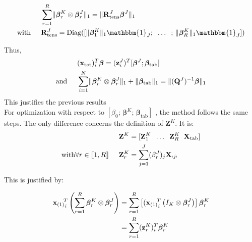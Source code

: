 \documentclass[preprint,12pt]{elsarticle}
\begin{document}
\begin{align}
                                & \sum\limits_{r = 1}^R \lVert \bm{\beta}_r^K \otimes \bm{\beta}_r^J \rVert_1 = \lVert \mathbf{R}_{\text{tens}}^J \bm{\beta}^J\rVert_1                             \\
    \text{with} \hspace{0.5 cm} & \mathbf{R}_{\text{tens}}^J = \text{Diag}([\lVert \bm{\beta}_1^K \rVert_1 \mathbbm{1}_J; \; \; \hdots \; \; ; \,  \lVert \bm{\beta}_R^K \rVert_1 \mathbbm{1}_J ])
\end{align}

\noindent Thus,
\begin{align}
                               & (\mathbf{x}_{\text{tot}})_i^T \bm{\beta}= (\mathbf{z}_i^J)^T [\bm{\beta}^J; \bm{\beta}_{\text{tab}}] \\
    \text{and} \hspace{0.5 cm} & \sum\limits_{i = 1}^N
    \lVert \bm{\beta}_r^K \otimes \bm{\beta}_r^J \rVert_1 + \lVert \bm{\beta}_{\text{tab}} \rVert_1= \lVert (\mathbf{Q}^J)^{-1} \bm{\beta} \rVert_1
\end{align}
This justifies the previous results\\[5 pt]
\noindent For optimization with respect to $\left[ \beta_0; \, \bm{\beta}^K; \, \bm{\beta}_{\text{tab}}  \right]$ , the method follows the same steps. The only difference concerns the definition of $\mathbf{Z}^K$. It is:
\begin{align}
                                                                         & \mathbf{Z}^K = [\mathbf{Z}_1^K \; \; \hdots \; \; \mathbf{Z}_R^K \; \; \mathbf{X}_{\text{tab}}] \\
    \text{with} \forall r \in \llbracket 1, R \rrbracket \hspace{0.5 cm} & \mathbf{Z}_r^K = \sum\limits_{j = 1}^J (\beta_r^J)_j \mathbf{X}_{:j:}
\end{align}

\noindent This is justified by:

\begin{align}
    {{\mathbf{x}_{(1)}}_i}^{\hspace{-5 pt} T}  \left( \sum\limits_{r = 1}^R \bm{\beta}_r^K \otimes \bm{\beta}_r^J \right) & = \sum\limits_{r = 1}^R \left[ ({{\mathbf{x}_{(1)}}_i}^{\hspace{-5 pt} T}  \left( I_K \otimes \bm{\beta}_r^J \right) \right] \bm{\beta}_r^K \\
                                                                                                                          & = \sum\limits_{r = 1}^R (\mathbf{z}_r^K)_i^T \bm{\beta}_r^K
\end{align}
\end{document}
